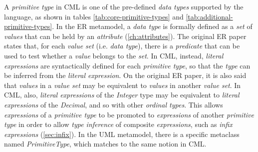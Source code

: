 \begin{definition}
A \emph{primitive type} in CML is one of the pre-defined \emph{data types}
supported by the language,
as shown in tables \ref{tab:core-primitive-types} and \ref{tab:additional-primitive-types}.
In the ER \cite{er} metamodel,
a \emph{data type} is formally defined as a \emph{set} of \emph{values}
that can be held by an \emph{attribute} (\ref{ch:attributes}).
The original ER paper \cite{er} states that,
for each \emph{value set} (i.e. \emph{data type}),
there is a \emph{predicate} that can be used to test
whether a \emph{value} belongs to the \emph{set}.
In CML, instead,
\emph{literal expressions} are syntactically defined for each \emph{primitive type},
so that the \emph{type} can be inferred from the \emph{literal expression}.
On the original ER paper,
it is also said that \emph{values} in a \emph{value set}
may be equivalent to \emph{values} in another \emph{value set}.
In CML, also,
\emph{literal expressions} of the \emph{Integer} type may be equivalent 
to \emph{literal expressions} of the \emph{Decimal},
and so with other \emph{ordinal types}.
This allows \emph{expressions} of a \emph{primitive type}
to be promoted to \emph{expressions} of another \emph{primitive type}
in order to allow \emph{type inference} of composite \emph{expressions},
such as \emph{infix expressions} (\ref{sec:infix}).
In the UML \cite{uml} metamodel,
there is a specific metaclass named \emph{PrimitiveType},
which matches to the same notion in CML.
\end{definition}

